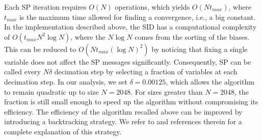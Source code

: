 \documentclass{article}
\begin{document}
Each SP iteration requires $O(N)$ operations, which yields $O(N t_{max})$, where $t_{max}$ is the maximum time allowed for finding a convergence, i.e., a big constant. In the implementation described above, the SID has a computational complexity of $O(t_{max} N^2 \log N )$, where the $N\log N$ comes from the sorting of the biases. This can be reduced to $O(Nt_{max}(\log N)^2)$ by noticing that fixing a single variable does not affect the SP messages significantly. Consequently, SP can be called every $N\delta$ decimation step by selecting a fraction of variables at each decimation step. 
In our analysis, we set $\delta = 0.00125$, which allows the algorithm to remain quadratic up to size $N=2048$. For sizes greater than $N=2048$, the fraction is still small enough to speed up the algorithm without compromising its efficiency.
The efficiency of the algorithm recalled above can be improved by introducing a backtracking strategy. We refer to \cite{marino_backtracking_2016} and references therein for a complete explanation of this strategy.
\end{document}
